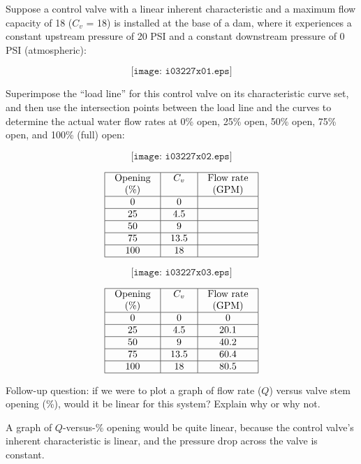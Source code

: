 

Suppose a control valve with a linear inherent characteristic and a maximum flow capacity of 18 ($C_v$ = 18) is installed at the base of a dam, where it experiences a constant upstream pressure of 20 PSI and a constant downstream pressure of 0 PSI (atmospheric):

$$\texttt{[image: i03227x01.eps]}$$

Superimpose the ``load line'' for this control valve on its characteristic curve set, and then use the intersection points between the load line and the curves to determine the actual water flow rates at 0\% open, 25\% open, 50\% open, 75\% open, and 100\% (full) open:

$$\texttt{[image: i03227x02.eps]}$$

$$\vbox{\offinterlineskip
\halign{\strut
\vrule \quad\hfil # \ \hfil & 
\vrule \quad\hfil # \ \hfil & 
\vrule \quad\hfil # \ \hfil \vrule \cr
\noalign{\hrule}
%
Opening & $C_v$ & Flow rate \cr
%
(\%) &  & (GPM) \cr
%
\noalign{\hrule}
%
0 & 0 & \cr
%
\noalign{\hrule}
%
25 & 4.5 & \cr
%
\noalign{\hrule}
%
50 & 9 & \cr
%
\noalign{\hrule}
%
75 & 13.5 & \cr
%
\noalign{\hrule}
%
100 & 18 & \cr
%
\noalign{\hrule}
} %
}$$ %







$$\texttt{[image: i03227x03.eps]}$$

$$\vbox{\offinterlineskip
\halign{\strut
\vrule \quad\hfil # \ \hfil & 
\vrule \quad\hfil # \ \hfil & 
\vrule \quad\hfil # \ \hfil \vrule \cr
\noalign{\hrule}
%
Opening & $C_v$ & Flow rate \cr
%
(\%) &  & (GPM) \cr
%
\noalign{\hrule}
%
0 & 0 & 0 \cr
%
\noalign{\hrule}
%
25 & 4.5 & 20.1 \cr
%
\noalign{\hrule}
%
50 & 9 & 40.2 \cr
%
\noalign{\hrule}
%
75 & 13.5 & 60.4 \cr
%
\noalign{\hrule}
%
100 & 18 & 80.5 \cr
%
\noalign{\hrule}
} %
}$$ %

\vskip 10pt

Follow-up question: if we were to plot a graph of flow rate ($Q$) versus valve stem opening (\%), would it be linear for this system?  Explain why or why not.







A graph of $Q$-versus-\% opening would be quite linear, because the control valve's inherent characteristic is linear, and the pressure drop across the valve is constant.




